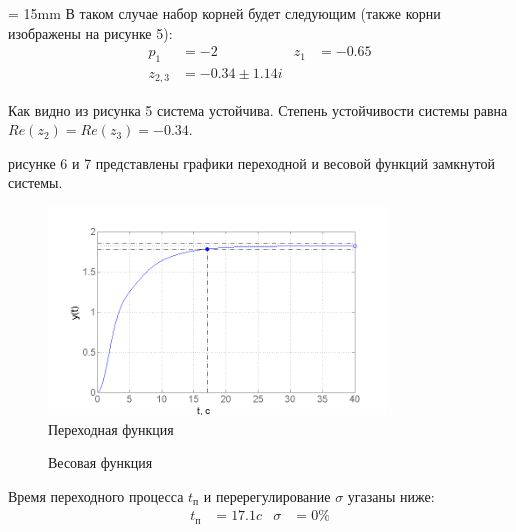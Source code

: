 \documentclass[a4paper, 12pt]{article}
\begin{document}
\begin{minipage}[t]{0.5\textwidth}
	\vspace{0.5cm}
	\parindent = 15mm
	В таком случае набор корней будет следующим (также корни изображены на рисунке 5):
	\begin{align*}
	p_1 & = -2 & 
	z_1 & =  -0.65 \\
	z_{2, 3} & =  -0.34 \pm 1.14i &
	\end{align*} \par
	Как видно из рисунка 5 система устойчива. Степень устойчивости системы равна $Re(z_2) = Re(z_3) = -0.34$.
\end{minipage}
\newpage
{} рисунке 6 и 7 представлены графики переходной и весовой функций замкнутой системы.
\begin{center}
	

\begin{figure}[h]
	\centering
	\includegraphics[width = 0.8\textwidth]{1}
	\caption{Переходная функция}
\end{figure}

\begin{figure} [H]
	\caption{Весовая функция} 
\end{figure}
\end{center}
Время переходного процесса $t_\text{п}$ и перерегулирование $\sigma$ угазаны ниже:
\begin{align*}
t_\text{п} & = 17.1 c & \sigma & = 0\%
\end{align*} \par
\end{document}

